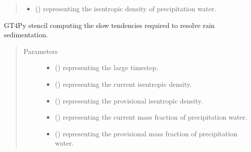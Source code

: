 \documentclass[letterpaper,10pt,english]{sphinxmanual}
\begin{document}
\begin{fulllineitems}
\begin{fulllineitems}
\begin{quote}
\begin{description}
\begin{itemize}
\item {} 
 () \textendash{}  representing the isentropic density of precipitation water.

\end{itemize}


\end{description}\end{quote}

\end{fulllineitems}


\begin{fulllineitems}
\label{\detokenize{api:tasmania.dycore.prognostic_isentropic_forward_euler.PrognosticIsentropicForwardEuler._stencil_computing_slow_tendencies_defs}}
GT4Py stencil computing the slow tendencies required to resolve rain sedimentation.
\begin{quote}\begin{description}
\item[{Parameters}] \leavevmode\begin{itemize}
\item {} 
 () \textendash{}  representing the large timestep.

\item {} 
 () \textendash{}  representing the current isentropic density.

\item {} 
 () \textendash{}  representing the provisional isentropic density.

\item {} 
 () \textendash{}  representing the current mass fraction of precipitation water.

\item {} 
 () \textendash{}  representing the provisional mass fraction of precipitation water.


\end{itemize}
\end{description}
\end{quote}
\end{fulllineitems}
\end{fulllineitems}
\end{document}
